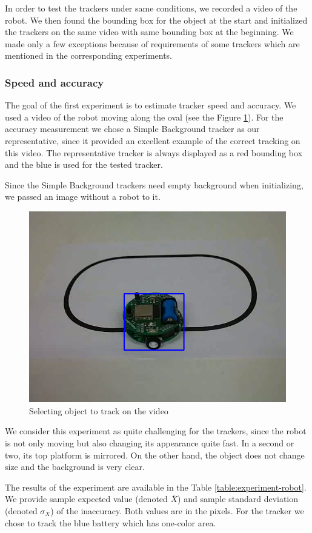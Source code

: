 In order to test the trackers under same conditions, we recorded a video of the
robot. We then found the bounding box for the object at the start and
initialized the trackers on the same video with same bounding box at the
beginning. We made only a few exceptions because of requirements of some
trackers which are mentioned in the corresponding experiments.

\subsubsection{Speed and accuracy}

The goal of the first experiment is to estimate tracker speed and accuracy. We
used a video of the robot moving along the oval (see the Figure
\ref{fig:robot-oval}). For the accuracy measurement we chose a Simple
Background tracker as our representative, since it provided an excellent
example of the correct tracking on this video. The representative tracker is
always displayed as a red bounding box and the blue is used for the tested
tracker.

Since the Simple Background trackers need empty background when
initializing, we passed an image without a robot to it.

\begin{figure}
\centering
\includegraphics[width=0.6\linewidth]{img/robot-oval.png}
\caption{Selecting object to track on the video}
\label{fig:robot-oval}
\end{figure}

We consider this experiment as quite challenging for the trackers, since the
robot is not only moving but also changing its appearance quite fast. In a
second or two, its top platform is mirrored. On the other hand, the object does
not change size and the background is very clear.

The results of the experiment are available in the Table
\ref{table:experiment-robot}. We provide sample expected value (denoted
$\bar{X}$) and sample standard deviation (denoted $\sigma_X$) of the
inaccuracy. Both values are in the pixels. For the \hsv{} tracker we chose to
track the blue battery which has one-color area.

